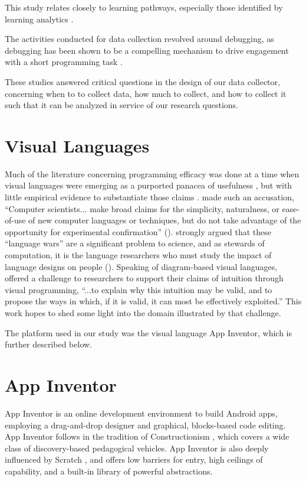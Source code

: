 This study relates closely to learning pathways, especially those identified by learning analytics \citep{martin2013nanogenetic}. 

The activities conducted for data collection revolved around debugging, as debugging has been shown to be a compelling mechanism to drive engagement with a short programming task \citep{webb2010troubleshooting}.

These studies answered critical questions in the design of our data collector, concerning when to to collect data, how much to collect, and how to collect it such that it can be analyzed in service of our research questions.


\section{Visual Languages}
\label{sec:visual-languages}

Much of the literature concerning programming efficacy was done at a time when visual languages were emerging as a purported panacea of usefulness \citep{shu-1988}, but with little empirical evidence to substantiate those claims \citep{petre-1995}. \citeauthor{sch-1980} made such an accusation, ``Computer scientists... make broad claims for the simplicity, naturalness, or ease-of-use of new computer languages or techniques, but do not take advantage of the opportunity for experimental confirmation'' (\citeyear{sch-1980}). \citeauthor{stefik2014programming} strongly argued that these ``language wars'' are a significant problem to science, and as stewards of computation, it is the language researchers who must study the impact of language designs on people (\citeyear{stefik2014programming}). Speaking of diagram-based visual languages, \citet{blackwell-2001} offered a challenge to researchers to support their claims of intuition through visual programming, ``...to explain why this intuition may be valid, and to propose the ways in which, if it is valid, it can most be effectively exploited.'' This work hopes to shed some light into the domain illustrated by that challenge. 

The platform used in our study was the visual language App Inventor, which is further described below.


\section{App Inventor}
\label{sec:app-inventor-background}
App Inventor is an online development environment to build Android apps, employing a drag-and-drop designer and graphical, blocks-based code editing. App Inventor follows in the tradition of Constructionism \citep{papert1991situating}, which covers a wide class of discovery-based pedagogical vehicles. App Inventor is also deeply influenced by Scratch \citep{resnick2009scratch}, and offers low barriers for entry, high ceilings of capability, and a built-in library of powerful abstractions.

